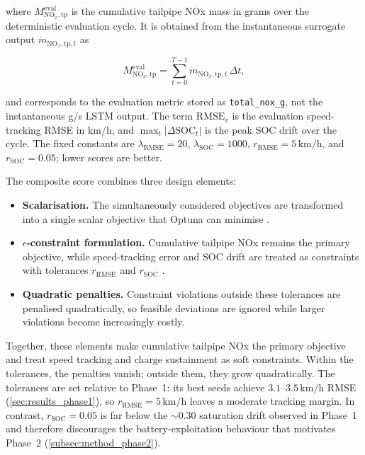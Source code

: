 where $M_{\mathrm{NO}_{x},\mathrm{tp}}^{\mathrm{eval}}$ is the cumulative tailpipe \ac{NOx} mass in grams over the deterministic evaluation cycle. It is obtained from the instantaneous surrogate output $\dot m_{\mathrm{NO}_{x},\mathrm{tp},t}$ as

\begin{equation}
  M_{\mathrm{NO}_{x},\mathrm{tp}}^{\mathrm{eval}}
  = \sum_{t=0}^{T-1} \dot m_{\mathrm{NO}_{x},\mathrm{tp},t}\,\Delta t,
  \label{eq:cumulative_nox_eval}
\end{equation}

and corresponds to the evaluation metric stored as \texttt{total\_nox\_g}, not the instantaneous g/s \ac{LSTM} output. The term $\mathrm{RMSE}_v$ is the evaluation speed-tracking \ac{RMSE} in km/h, and $\max_t|\Delta\mathrm{SOC}_t|$ is the peak \ac{SOC} drift over the cycle. The fixed constants are $\lambda_{\text{RMSE}} = 20$, $\lambda_{\text{SOC}} = 1000$, $r_{\text{RMSE}} = 5\,\text{km/h}$, and $r_{\text{SOC}} = 0.05$; lower scores are better.

The composite score combines three design elements:
\begin{itemize}
  \item \textbf{Scalarisation.} The simultaneously considered objectives are transformed into a single scalar objective that Optuna can minimise \cite{helfrich_using_2024}.
  \item \textbf{$\epsilon$-constraint formulation.} Cumulative tailpipe \ac{NOx} remains the primary objective, while speed-tracking error and \ac{SOC} drift are treated as constraints with tolerances $r_{\text{RMSE}}$ and $r_{\text{SOC}}$ \cite{haimes_bicriterion_1971}.
  \item \textbf{Quadratic penalties.} Constraint violations outside these tolerances are penalised quadratically, so feasible deviations are ignored while larger violations become increasingly costly.
\end{itemize}

Together, these elements make cumulative tailpipe \ac{NOx} the primary objective and treat speed tracking and charge sustainment as soft constraints. Within the tolerances, the penalties vanish; outside them, they grow quadratically. The tolerances are set relative to Phase~1: its best seeds achieve $3.1$--$3.5\,\text{km/h}$ \ac{RMSE} (\autoref{sec:results_phase1}), so $r_{\text{RMSE}} = 5\,\text{km/h}$ leaves a moderate tracking margin. In contrast, $r_{\text{SOC}} = 0.05$ is far below the $\sim\!0.30$ saturation drift observed in Phase~1 and therefore discourages the battery-exploitation behaviour that motivates Phase~2 (\autoref{subsec:method_phase2}).

